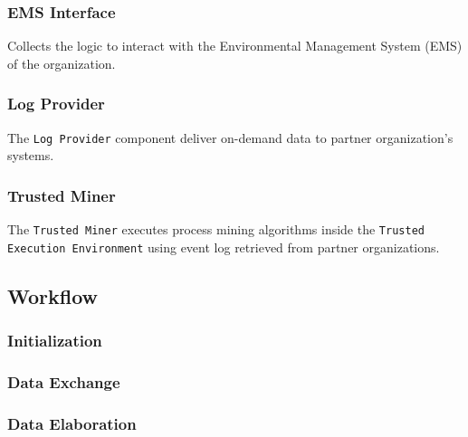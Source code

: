 \subsubsection{EMS Interface}
Collects the logic to interact with the Environmental Management System (EMS) of the organization.

\subsubsection{Log Provider}
The \texttt{Log Provider} component deliver on-demand data to partner organization's systems.
\subsubsection{Trusted Miner}
 The \texttt{Trusted Miner} executes process mining algorithms inside the \texttt{Trusted Execution Environment} using event log retrieved from partner organizations.
\subsection{Workflow}
\subsubsection{Initialization}
\subsubsection{Data Exchange}
\subsubsection{Data Elaboration}



